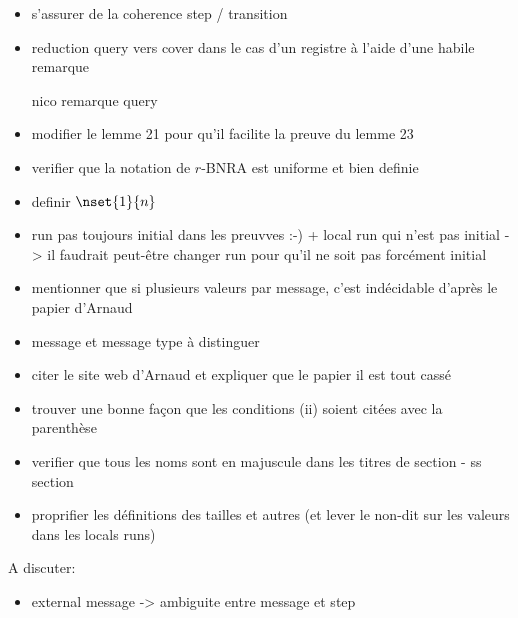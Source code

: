 \begin{itemize}
	\item s'assurer de la coherence step / transition
    \item reduction query vers cover dans le cas d'un registre à l'aide d'une habile remarque
    \item[nico] remarque query 
    \item modifier le lemme 21 pour qu'il facilite la preuve du lemme 23
    \item verifier que la notation de $r$-BNRA est uniforme et bien definie
    \item definir $\nset{1}{n}$
    \item run pas toujours initial dans les preuvves :-) + local run qui n'est pas initial -> il faudrait peut-être changer run pour qu'il ne soit pas forcément initial
    \item mentionner que si plusieurs valeurs par message, c'est indécidable d'après le papier d'Arnaud
    \item message et message type à distinguer 
    \item citer le site web d'Arnaud et expliquer que le papier il est tout cassé
    \item trouver une bonne façon que les conditions (ii) soient citées avec la parenthèse
    \item verifier que tous les noms sont en majuscule dans les titres de section - ss section
    \item proprifier les définitions des tailles et autres (et lever le non-dit sur les valeurs dans les locals runs)
\end{itemize}

A discuter:
\begin{itemize}
\item external message -> ambiguite entre message et step 
\end{itemize}